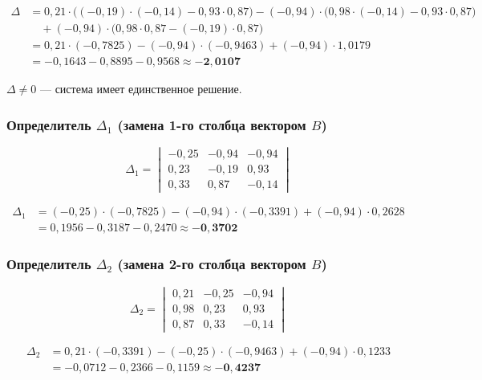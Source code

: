 \documentclass[a4paper,12pt]{article}
\begin{document}
\begin{align*}
\Delta &= 0{,}21\cdot\bigl((-0{,}19)\cdot(-0{,}14) - 0{,}93\cdot 0{,}87\bigr)
        - (-0{,}94)\cdot\bigl(0{,}98\cdot(-0{,}14) - 0{,}93\cdot 0{,}87\bigr)\\
       &\quad + (-0{,}94)\cdot\bigl(0{,}98\cdot 0{,}87 - (-0{,}19)\cdot 0{,}87\bigr) \\
      &= 0{,}21\cdot(-0{,}7825) - (-0{,}94)\cdot(-0{,}9463) + (-0{,}94)\cdot 1{,}0179 \\
      &= -0{,}1643 - 0{,}8895 - 0{,}9568 \approx \mathbf{-2{,}0107}
\end{align*}

$\Delta \neq 0$ --- система имеет единственное решение.

\subsubsection{Определитель \texorpdfstring{$\Delta_1$}{Delta1} (замена 1-го столбца вектором \texorpdfstring{$B$}{B})}

\[
\Delta_1 =
\begin{vmatrix} -0{,}25 & -0{,}94 & -0{,}94 \\ 0{,}23 & -0{,}19 & 0{,}93 \\ 0{,}33 & 0{,}87 & -0{,}14 \end{vmatrix}
\]

\begin{align*}
\Delta_1 &= (-0{,}25)\cdot(-0{,}7825) - (-0{,}94)\cdot(-0{,}3391) + (-0{,}94)\cdot 0{,}2628 \\
         &= 0{,}1956 - 0{,}3187 - 0{,}2470 \approx \mathbf{-0{,}3702}
\end{align*}

\subsubsection{Определитель \texorpdfstring{$\Delta_2$}{Delta2} (замена 2-го столбца вектором \texorpdfstring{$B$}{B})}

\[
\Delta_2 =
\begin{vmatrix} 0{,}21 & -0{,}25 & -0{,}94 \\ 0{,}98 & 0{,}23 & 0{,}93 \\ 0{,}87 & 0{,}33 & -0{,}14 \end{vmatrix}
\]

\begin{align*}
\Delta_2 &= 0{,}21\cdot(-0{,}3391) - (-0{,}25)\cdot(-0{,}9463) + (-0{,}94)\cdot 0{,}1233 \\
         &= -0{,}0712 - 0{,}2366 - 0{,}1159 \approx \mathbf{-0{,}4237}
\end{align*}
\end{document}
